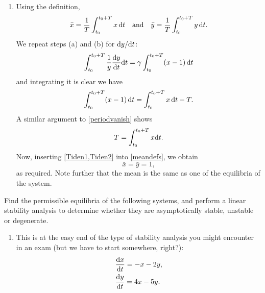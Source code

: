 \documentclass[a4paper, 12pt]{article}
\begin{document}
\begin{enumerate}[label={\bf \arabic{*}.\;}, ref={\arabic{*}},itemsep=3ex, left=0ex]
{\begin{enumerate}[label=(\alph*)]
        \item Using the definition,
          \begin{equation}
            \label{meandefs}
            \bar{x} = \frac{1}{T}\int_{t_0}^{t_0+T}x\,{\mathrm d}{t}\quad\text{and}\quad\bar{y} = \frac{1}{T}\int_{t_0}^{t_0+T}y\,{\mathrm d}{t}.
          \end{equation}
          We repeat steps (a) and (b) for $\fd{y}{t}$:
          \begin{equation}
            \int_{t_0}^{t_0+T}\frac{1}{y}\fd{y}{t}\d{t} = \gamma\int_{t_0}^{t_0+T}(x-1)\,\d{t}
          \end{equation}
          and integrating it is clear we have
          \begin{equation}
            \int_{t_0}^{t_0+T}(x-1)\,{\mathrm d}{t}= \int_{t_0}^{t_0+T}x\,{\mathrm d}{t} -T.
          \end{equation}
          A similar argument to \cref{periodvanish} shows
          \begin{equation}
            \label{Tiden2}
            T = \int_{t_0}^{t_0+T}x{\mathrm d}{t}.
          \end{equation}
          Now, inserting \cref{Tiden1,Tiden2} into \cref{meandefs}, we obtain
          \begin{equation}
            \bar{x} = \bar{y} =1,
          \end{equation}
          as required. Note further that the mean is the same as one of the equilibria of the system.

      \end{enumerate}

    }


    {
      Find the permissible equilibria of the following systems, and perform a linear stability analysis to determine whether they are asymptotically stable, unstable or degenerate.
      \begin{enumerate}[label=(\alph{*})]
        \item This is at the easy end of the type of stability analysis you might encounter in an exam (but we have to start somewhere, right?):
          \begin{subequations}
            \begin{align}
              &\fd{x}{t}= -x -2y, \\
              &\fd{y}{t}= 4x-5y.
            \end{align}
          \end{subequations}


\end{enumerate}}
\end{enumerate}
\end{document}
